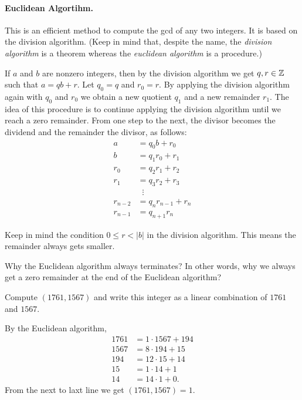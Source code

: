 \documentclass[11pt,a4paper]{article}
\begin{document}
\paragraph{Euclidean Algortihm.} This is an efficient method to compute the gcd of any  two integers.
It is based on the division algorithm.
(Keep in mind that, despite the name, the \textit{division algorithm} is a theorem whereas the \textit{euclidean algorithm} is a procedure.)

If \(a\) and \(b\) are nonzero integers, then by the division algorithm we get \(q,r\in \mathbb{Z}\) such that \(a= qb+r\).
Let \(q_0=q\) and \(r_0=r\).
By applying the division algorithm again with \(q_0\) and \(r_0\) we obtain a new quotient \(q_1\)   and a new remainder \(r_1\).
The idea of this procedure is to continue applying the division algorithm until we reach a zero remainder. From one step to the next,  the divisor becomes the dividend and the remainder the divisor, as follows:
\begin{align*}
a & =q_0 b+r_0 \\
b & =q_1 r_0+r_1 \\
r_0 & =q_2 r_1+r_2 \\
r_1 & =q_3 r_2+r_3 \\
&\;\; \vdots \\
r_{n-2} & =q_n r_{n-1}+r_n \\
r_{n-1} & =q_{n+1} r_n
\end{align*}

\begin{rem}
    Keep in mind the condition \(0\leq r < |b|\) in the division algorithm.
    This means the remainder always gets smaller.
\end{rem}

\begin{que}
    Why the Euclidean algorithm always terminates? In other words,
    why we always get a zero remainder at the end of the Euclidean algorithm?
\end{que}

\begin{eje}
    Compute \((1761, 1567)\) and write this integer as a linear combination of \(1761\) and \(1567\).
\end{eje}

\begin{sol} By the Euclidean algorithm,
   \begin{align*}
    1761 &= 1\cdot 1567 + 194\\
    1567 &= 8\cdot194 + 15\\
    194  &= 12\cdot 15 + 14\\
    15   &= 1\cdot 14 + 1 \\
    14   &= 14\cdot 1 + 0.
   \end{align*}
   From the next to laxt line we get \((1761,1567) = 1\).
\end{sol}
\end{document}
